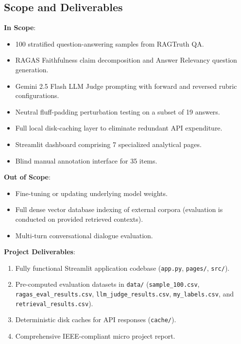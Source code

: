 \documentclass[11pt,a4paper]{article}
\begin{document}
\subsection{Scope and Deliverables}
\textbf{In Scope}:
\begin{itemize}[leftmargin=*]
    \item 100 stratified question-answering samples from RAGTruth QA.
    \item RAGAS Faithfulness claim decomposition and Answer Relevancy question generation.
    \item Gemini 2.5 Flash LLM Judge prompting with forward and reversed rubric configurations.
    \item Neutral fluff-padding perturbation testing on a subset of 19 answers.
    \item Full local disk-caching layer to eliminate redundant API expenditure.
    \item Streamlit dashboard comprising 7 specialized analytical pages.
    \item Blind manual annotation interface for 35 items.
\end{itemize}

\textbf{Out of Scope}:
\begin{itemize}[leftmargin=*]
    \item Fine-tuning or updating underlying model weights.
    \item Full dense vector database indexing of external corpora (evaluation is conducted on provided retrieved contexts).
    \item Multi-turn conversational dialogue evaluation.
\end{itemize}

\textbf{Project Deliverables}:
\begin{enumerate}[leftmargin=*]
    \item Fully functional Streamlit application codebase (\texttt{app.py}, \texttt{pages/}, \texttt{src/}).
    \item Pre-computed evaluation datasets in \texttt{data/} (\texttt{sample\_100.csv}, \texttt{ragas\_eval\_results.csv}, \texttt{llm\_judge\_results.csv}, \texttt{my\_labels.csv}, and \texttt{retrieval\_results.csv}).
    \item Deterministic disk caches for API responses (\texttt{cache/}).
    \item Comprehensive IEEE-compliant micro project report.
\end{enumerate}
\end{document}
